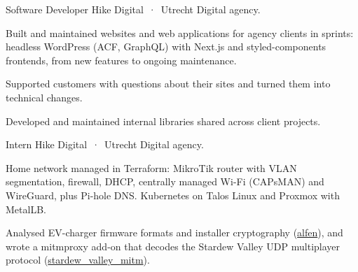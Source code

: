 \sepspace

{Software Developer}
{Hike Digital \,·\, Utrecht}
{Digital agency.}
{%
\begin{compactitem}
  \item Built and maintained websites and web applications for agency clients in sprints: headless
    WordPress (ACF, GraphQL) with Next.js and styled-components frontends, from new features to
    ongoing maintenance.
  \item Supported customers with questions about their sites and turned them into technical changes.
  \item Developed and maintained internal libraries shared across client projects.
\end{compactitem}
}

\sepspace

{Intern}
{Hike Digital \,·\, Utrecht}
{Digital agency.}
{}



{Home network managed in Terraform: MikroTik router with VLAN segmentation, firewall, DHCP, centrally
managed Wi-Fi (CAPsMAN) and WireGuard, plus Pi-hole DNS. Kubernetes on Talos Linux and Proxmox with
MetalLB.}

{Analysed EV-charger firmware formats and installer cryptography
(\href{https://github.com/cvanh/alfen}{\color{accent}alfen}), and wrote a mitmproxy add-on that
decodes the Stardew Valley UDP multiplayer protocol
(\href{https://github.com/cvanh/stardew_valley_mitm}{\color{accent}stardew\_valley\_mitm}).}

